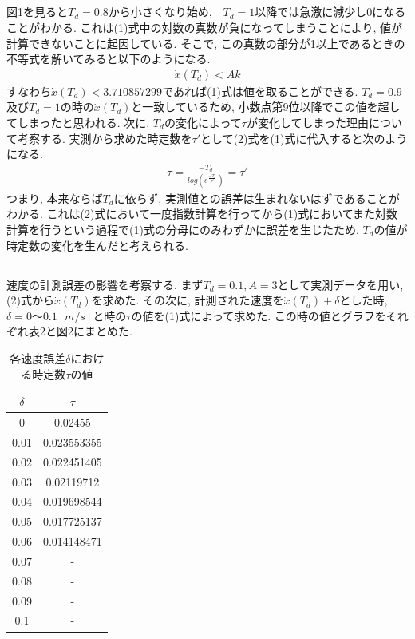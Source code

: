 \documentclass[a4paper,11pt]{jsarticle}
\begin{document}
\subsection{}
図1を見ると$T_d=0.8$から小さくなり始め,　$T_d=1$以降では急激に減少し$0$になることがわかる.
これは(1)式中の対数の真数が負になってしまうことにより, 値が計算できないことに起因している.
そこで, この真数の部分が1以上であるときの不等式を解いてみると以下のようになる.
\begin{align}
	\dot{x}(T_d)<Ak
\end{align}
すなわち$\dot{x}(T_d)<3.710857299$であれば(1)式は値を取ることができる. $T_d=0.9$及び$T_d=1$の時の$\dot{x}(T_d)$と一致しているため, 小数点第9位以降でこの値を超してしまったと思われる.
次に, $T_d$の変化によって$\tau$が変化してしまった理由について考察する.
実測から求めた時定数を$\tau'$として(2)式を(1)式に代入すると次のようになる.
\begin{align}
	\tau=\frac{-T_d}{log(e^{\frac{-T_d}{\tau'}})}=\tau'
\end{align}
つまり, 本来ならば$T_d$に依らず, 実測値との誤差は生まれないはずであることがわかる.
これは(2)式において一度指数計算を行ってから(1)式においてまた対数計算を行うという過程で(1)式の分母にのみわずかに誤差を生じたため, $T_d$の値が時定数の変化を生んだと考えられる.

\subsection{}
速度の計測誤差の影響を考察する. まず$T_d=0.1,A=3$として実測データを用い, (2)式から$\dot{x}(T_d)$を求めた.
その次に, 計測された速度を$\dot{x}(T_d)+\delta$とした時, $\delta=0〜0.1[m/s]$と時の$\tau$の値を(1)式によって求めた.
この時の値とグラフをそれぞれ表2と図2にまとめた.

\begin{table}[H]
	\caption{各速度誤差$\delta$における時定数$\tau$の値}
	\label{No.1}
	\begin{center}
		\begin{tabular}{|c|c|}\hline
			$\delta$ & $\tau$ \\ \hline
			0 & 0.02455 \\ \hline
			0.01 & 0.023553355 \\ \hline
			0.02 & 0.022451405 \\ \hline
			0.03 & 0.02119712 \\ \hline
			0.04 & 0.019698544 \\ \hline
			0.05 & 0.017725137 \\ \hline
			0.06 & 0.014148471 \\ \hline
			0.07 & - \\ \hline
			0.08 & - \\ \hline
			0.09 & - \\ \hline
			0.1 & - \\ \hline
		\end{tabular}
\end{center}
\end{table}
\end{document}
